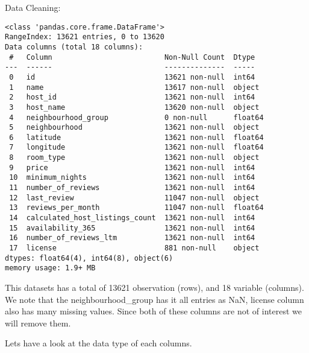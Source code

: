 \documentclass[
  ignorenonframetext,
]{beamer}
\begin{document}
\begin{frame}[fragile]{Data Cleaning:}
\begin{verbatim}
<class 'pandas.core.frame.DataFrame'>
RangeIndex: 13621 entries, 0 to 13620
Data columns (total 18 columns):
 #   Column                          Non-Null Count  Dtype  
---  ------                          --------------  -----  
 0   id                              13621 non-null  int64  
 1   name                            13617 non-null  object 
 2   host_id                         13621 non-null  int64  
 3   host_name                       13620 non-null  object 
 4   neighbourhood_group             0 non-null      float64
 5   neighbourhood                   13621 non-null  object 
 6   latitude                        13621 non-null  float64
 7   longitude                       13621 non-null  float64
 8   room_type                       13621 non-null  object 
 9   price                           13621 non-null  int64  
 10  minimum_nights                  13621 non-null  int64  
 11  number_of_reviews               13621 non-null  int64  
 12  last_review                     11047 non-null  object 
 13  reviews_per_month               11047 non-null  float64
 14  calculated_host_listings_count  13621 non-null  int64  
 15  availability_365                13621 non-null  int64  
 16  number_of_reviews_ltm           13621 non-null  int64  
 17  license                         881 non-null    object 
dtypes: float64(4), int64(8), object(6)
memory usage: 1.9+ MB
\end{verbatim}

This datasets has a total of 13621 observation (rows), and 18 variable
(columns). We note that the neighbourhood\_group has it all entries as
NaN, license column also has many missing values. Since both of these
columns are not of interest we will remove them.

Lets have a look at the data type of each columns.


\end{frame}
\end{document}
